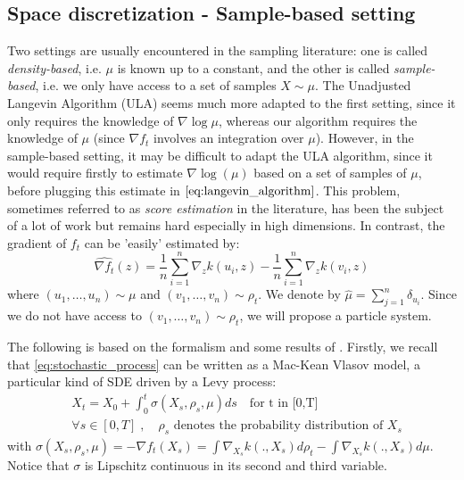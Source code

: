 

\subsection{Space discretization - Sample-based setting}

Two settings are usually encountered in the sampling literature: one is called \textit{density-based}, i.e. $\mu$ is known up to a constant, and the other is called \textit{sample-based}, i.e. we only have access to a set of samples $X \sim \mu$.
The Unadjusted Langevin Algorithm (ULA) seems much more adapted to the first setting, since it only requires the knowledge of $\nabla \log \mu$, whereas our algorithm requires the knowledge of $\mu$ (since $\nabla f_t$ involves an integration over $\mu$). However, in the sample-based setting, it may be difficult to adapt the ULA algorithm, since it would require firstly to estimate $\nabla \log(\mu)$ based on a set of samples of $\mu$, before plugging this estimate in $\eqref{eq:langevin_algorithm}$. This problem, sometimes referred to as \textit{score estimation} in the literature, has been the subject of a lot of work but remains hard especially in high dimensions. In contrast, the gradient of $f_t$ can be 'easily' estimated by:
\begin{equation}
\widehat{\nabla f_t}(z)= \frac{1}{n}\sum_{i=1}^{n}\nabla_{z}k(u_i,z) -\frac{1}{n}\sum_{i=1}^{n}\nabla_{z}k(v_i,z) 
\end{equation}
where $(u_1, \dots, u_n)\sim \mu$ and $(v_1, \dots, v_n)\sim \rho_t$. We denote by $\widehat{ \mu}=\sum_{j=1}^{n}\delta_{u_i}$. Since we do not have access to $(v_1, \dots, v_n)\sim \rho_t$, we will propose a particle system.


\vspace{0.5cm}
The following is based on the formalism and some results of \cite{jourdain2007nonlinear}. Firstly, we recall that \eqref{eq:stochastic_process} can be written as a Mac-Kean Vlasov model, a particular kind of SDE driven by a Levy process:
\begin{align}\label{eq:theoretical_process}
&X_t=X_{0}+\int_{0}^t \sigma(X_s, \rho_s, \mu)ds \quad \text{for t in [0,T]}\\
&\forall s \in [0,T]\;,\quad \rho_s \text{ denotes the probability distribution of } X_s
\end{align}
with $\sigma(X_s, \rho_s, \mu)=-\nabla f_t(X_s)=\int \nabla_{X_s}k(.,X_s) d\rho_t -  \int \nabla_{X_s}k(.,X_s) d\mu$. Notice that $\sigma$ is Lipschitz continuous in its second and third variable.

